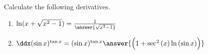 \documentclass{ximera}
\author{Nela Lakos}
\begin{document}
\begin{exercise}

Calculate the following derivatives.
\begin{enumerate}
\item $\ln(x+\sqrt{x^2-1}) =\frac{1}{\answer{\sqrt{x^2-1}}}$\\
\item$ \ddx(\sin x)^{\tan{x}} = (\sin{x})^{\tan{x}}\answer{\Bigl(1+\sec^2{(x)}\ln{(\sin{x})}\Bigr)}$\\
\end{enumerate}
\end{exercise}
\end{document}
